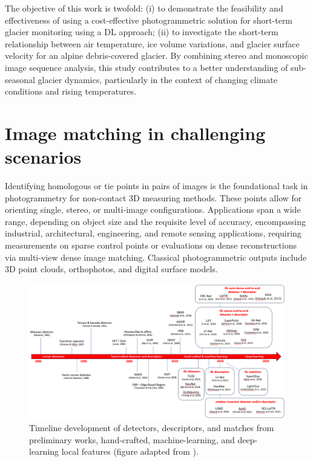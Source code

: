 The objective of this work is twofold:
(i) to demonstrate the feasibility and effectiveness of using a cost-effective photogrammetric solution for short-term glacier monitoring using a DL approach;
(ii) to investigate the short-term relationship between air temperature, ice volume variations, and glacier surface velocity for an alpine debris-covered glacier.
By combining stereo and monoscopic image sequence analysis, this study contributes to a better understanding of sub-seasonal glacier dynamics,
particularly in the context of changing climate conditions and rising temperatures.


\section{Image matching in challenging scenarios}\label{sec:4:localfeatures}

Identifying homologous or tie points in pairs of images is the foundational task in photogrammetry for non-contact 3D measuring methods. 
These points allow for orienting single, stereo, or multi-image configurations. Applications span a wide range, depending on object size and the requisite level of accuracy, encompassing industrial, architectural, engineering, and remote sensing applications, requiring measurements on sparse control points or evaluations on dense reconstructions via multi-view dense image matching. 
Classical photogrammetric outputs include 3D point clouds, orthophotos, and digital surface models. 

\begin{figure}
    \centering
    \includegraphics[width=1\textwidth]{local_feats_history}    
    \caption{Timeline development of detectors, descriptors, and matches from preliminary works, hand-crafted, machine-learning, and deep-learning local features (figure adapted from \citet{remondino2022_at_with_dl}).}
    \label{fig:4:feats_history}
\end{figure}

